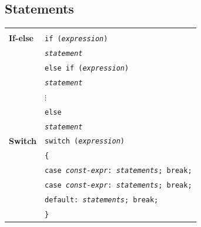 \subsection{Statements}

\begin{minipage}{\linewidth}

\begin{tabularx}{\linewidth}{l|X}
    \hline\\
    \textbf{If-else} & \texttt{if (\textit{expression})} \\ &
    \texttt{\qquad \textit{statement}} \\ &
    \texttt{else if (\textit{expression})} \\ &
    \texttt{\qquad \textit{statement}} \\ &
    $\vdots$\\ &
    \texttt{else} \\ &
    \texttt{\qquad \textit{statement}}\\

    \hline

    \textbf{Switch} & \texttt{switch (\textit{expression})}\\
    & \texttt{\{}\\
    & \texttt{\qquad case \textit{const-expr}: \textit{statements}; break;}\\
    & \texttt{\qquad case \textit{const-expr}: \textit{statements}; break;}\\
    & \texttt{\qquad default: \textit{statements}; break;} \\
    & \texttt{\}}\\


\end{tabularx}
\end{minipage}
